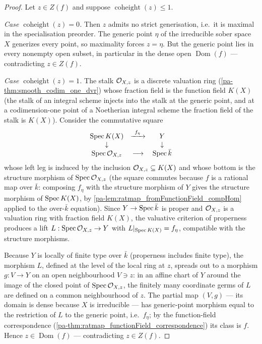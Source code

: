 \begin{proof}
  \leanok
  Let \(z \in Z(f)\) and suppose \(\operatorname{coheight}(z) \leq 1\).

  \emph{Case \(\operatorname{coheight}(z) = 0\).} Then \(z\) admits no strict
  generisation, i.e.\ it is maximal in the specialisation preorder. The generic
  point \(\eta\) of the irreducible sober space \(X\) generizes every point, so
  maximality forces \(z = \eta\). But the generic point lies in every nonempty
  open subset, in particular in the dense open \(\operatorname{Dom}(f)\) ---
  contradicting \(z \in Z(f)\).

  \emph{Case \(\operatorname{coheight}(z) = 1\).} The stalk
  \(\mathcal{O}_{X,z}\) is a discrete valuation ring
  (\ref{pa-thm:smooth_codim_one_dvr}) whose fraction field is the function field
  \(K(X)\) (the stalk of an integral scheme injects into the stalk at the
  generic point, and at a codimension-one point of a Noetherian integral scheme
  the fraction field of the stalk is \(K(X)\)). Consider the commutative
  square
  \[
    \begin{array}{ccc}
      \operatorname{Spec} K(X) & \xrightarrow{\ f_\eta\ } & Y \\
      \downarrow & & \downarrow \\
      \operatorname{Spec} \mathcal{O}_{X,z} & \longrightarrow & \operatorname{Spec} \bar k
    \end{array}
  \]
  whose left leg is induced by the inclusion \(\mathcal{O}_{X,z} \subseteq K(X)\)
  and whose bottom is the structure morphism of \(\operatorname{Spec} \mathcal{O}_{X,z}\) (the
  square commutes because \(f\) is a rational map over \(\bar k\): composing
  \(f_\eta\) with the structure morphism of \(Y\) gives the structure morphism
  of \(\operatorname{Spec} K(X)\), by \ref{pa-lem:ratmap_fromFunctionField_compHom} applied to
  the over-\(\bar k\) equation). Since \(Y \to \operatorname{Spec} \bar k\) is proper and
  \(\mathcal{O}_{X,z}\) is a valuation ring with fraction field \(K(X)\), the
  valuative criterion of properness produces a lift
  \(L : \operatorname{Spec} \mathcal{O}_{X,z} \to Y\) with
  \(L|_{\operatorname{Spec} K(X)} = f_\eta\), compatible with the structure morphisms.

  Because \(Y\) is locally of finite type over \(\bar k\) (properness includes
  finite type), the morphism \(L\), defined at the level of the local ring at
  \(z\), spreads out to a morphism \(g : V \to Y\) on an open neighbourhood
  \(V \ni z\): in an affine chart of \(Y\) around the image of the closed point
  of \(\operatorname{Spec} \mathcal{O}_{X,z}\), the finitely many coordinate germs of \(L\) are
  defined on a common neighbourhood of \(z\). The partial map \((V, g)\) --- its
  domain is dense because \(X\) is irreducible --- has generic-point morphism
  equal to the restriction of \(L\) to the generic point, i.e.\ \(f_\eta\); by
  the function-field correspondence
  (\ref{pa-thm:ratmap_functionField_correspondence}) its class is \(f\). Hence
  \(z \in \operatorname{Dom}(f)\) --- contradicting \(z \in Z(f)\).
\end{proof}

